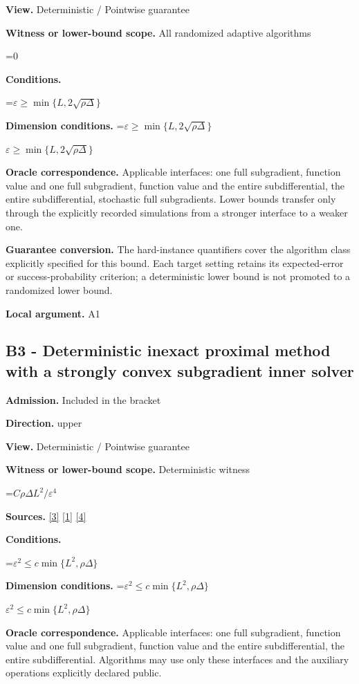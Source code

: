 \documentclass[10pt,a4paper]{article}
\newcommand{\AtlasMath}[1]{\par\begingroup\centering\setbox0=\hbox{$\displaystyle #1$}\ifdim\wd0>1.4\linewidth\typeout{ATLAS WIDE FORMULA: \the\wd0}\fi\ifdim\wd0>\linewidth\resizebox{\linewidth}{!}{\box0}\else\box0\fi\par\endgroup}
\newcommand{\AtlasInlineMath}[1]{\begingroup\setbox0=\hbox{$#1$}\ifdim\wd0>.4\linewidth\endgroup\AtlasMath{#1}\else\endgroup$#1$\fi}
\begin{document}
\textbf{View.} Deterministic / Pointwise guarantee

\textbf{Witness or lower-bound scope.} All randomized adaptive algorithms

\AtlasMath{0}
\textbf{Conditions.} 
\AtlasMath{\varepsilon\ge\min\{L,2\sqrt{\rho\Delta}\}}


\textbf{Dimension conditions.} \AtlasInlineMath{\varepsilon\ge\min\{L,2\sqrt{\rho\Delta}\}}

\textbf{Oracle correspondence.} Applicable interfaces: one full subgradient, function value and one full subgradient, function value and the entire subdifferential, the entire subdifferential, stochastic full subgradients. Lower bounds transfer only through the explicitly recorded simulations from a stronger interface to a weaker one.

\textbf{Guarantee conversion.} The hard-instance quantifiers cover the algorithm class explicitly specified for this bound. Each target setting retains its expected-error or success-probability criterion; a deterministic lower bound is not promoted to a randomized lower bound.

\textbf{Local argument.} A1

\subsection{B3 - Deterministic inexact proximal method with a strongly convex subgradient inner solver}
\textbf{Admission.} Included in the bracket

\textbf{Direction.} upper

\textbf{View.} Deterministic / Pointwise guarantee

\textbf{Witness or lower-bound scope.} Deterministic witness

\AtlasMath{C\rho\Delta L^2/\varepsilon^4}
\textbf{Sources.} \href{https://arxiv.org/pdf/1405.4980}{[3]} \href{https://www2.isye.gatech.edu/~nemirovs/MOR_AccuracyCertificates.pdf}{[1]} \href{https://arxiv.org/pdf/2609.20701}{[4]}

\textbf{Conditions.} 
\AtlasMath{\varepsilon^2\le c\min\{L^2,\rho\Delta\}}


\textbf{Dimension conditions.} \AtlasInlineMath{\varepsilon^2\le c\min\{L^2,\rho\Delta\}}

\textbf{Oracle correspondence.} Applicable interfaces: one full subgradient, function value and one full subgradient, function value and the entire subdifferential, the entire subdifferential. Algorithms may use only these interfaces and the auxiliary operations explicitly declared public.
\end{document}
